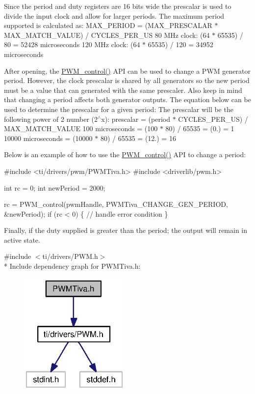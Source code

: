 Since the period and duty registers are 16 bits wide the prescalar is used to divide the input clock and allow for larger periods. The maximum period supported is calculated as\+: M\+A\+X\+\_\+\+P\+E\+R\+I\+O\+D = (M\+A\+X\+\_\+\+P\+R\+E\+S\+C\+A\+L\+A\+R $\ast$ M\+A\+X\+\_\+\+M\+A\+T\+C\+H\+\_\+\+V\+A\+L\+U\+E) / C\+Y\+C\+L\+E\+S\+\_\+\+P\+E\+R\+\_\+\+U\+S 80 M\+Hz clock\+: (64 $\ast$ 65535) / 80 = 52428 microseconds 120 M\+Hz clock\+: (64 $\ast$ 65535) / 120 = 34952 microseconds

After opening, the \hyperlink{_p_w_m_8h_ade999f5b12997479efa1ac85aaf46ef5}{P\+W\+M\+\_\+control()} A\+P\+I can be used to change a P\+W\+M generator period. However, the clock prescalar is shared by all generators so the new period must be a value that can generated with the same prescaler. Also keep in mind that changing a period affects both generator outputs. The equation below can be used to determine the prescalar for a given period\+: The prescalar will be the following power of 2 number (2$^\wedge$x)\+: prescalar = (period $\ast$ C\+Y\+C\+L\+E\+S\+\_\+\+P\+E\+R\+\_\+\+U\+S) / M\+A\+X\+\_\+\+M\+A\+T\+C\+H\+\_\+\+V\+A\+L\+U\+E 100 microseconds = (100 $\ast$ 80) / 65535 = (0.) = 1 10000 microseconds = (10000 $\ast$ 80) / 65535 = (12.) = 16

Below is an example of how to use the \hyperlink{_p_w_m_8h_ade999f5b12997479efa1ac85aaf46ef5}{P\+W\+M\+\_\+control()} A\+P\+I to change a period\+:


\begin{DoxyCode}
\textcolor{preprocessor}{#include <ti/drivers/pwm/PWMTiva.h>}
\textcolor{preprocessor}{#include <driverlib/pwm.h>}

\textcolor{keywordtype}{int} rc = 0;
\textcolor{keywordtype}{int} newPeriod = 2000;

rc = PWM_control(pwmHandle, PWMTiva_CHANGE_GEN_PERIOD, &newPeriod);
\textcolor{keywordflow}{if} (rc < 0) \{
    \textcolor{comment}{// handle error condition}
\}
\end{DoxyCode}


Finally, if the duty supplied is greater than the period; the output will remain in active state. 

{\ttfamily \#include $<$ti/drivers/\+P\+W\+M.\+h$>$}\\*
Include dependency graph for P\+W\+M\+Tiva.\+h\+:
\nopagebreak
\begin{figure}[H]
\begin{center}
\leavevmode
\includegraphics[width=155pt]{_p_w_m_tiva_8h__incl}
\end{center}
\end{figure}
